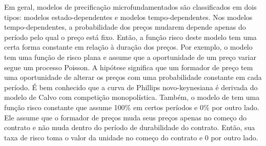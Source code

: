 \documentclass[twoside,a4paper,11pt]{report}
\begin{document}
% 
% 

Em geral, modelos de precificação microfundamentados são classificados em dois tipos: modelos estado-dependentes e modelos tempo-dependentes. Nos modelos tempo-dependentes, a probabilidade dos preços mudarem depende apenas do período pelo qual o preço está fixo. Então, a função risco deste modelo tem uma certa forma constante em relação à duração dos preços. Por exemplo, o modelo \citet{calvo1983staggered} tem uma função de risco plana e assume que a oportunidade de um preço variar segue um processo Poisson. A hipótese significa que um formador de preço tem uma oportunidade de alterar os preços com uma probabilidade constante em cada período. É bem conhecido que a curva de Phillips novo-keynesiana é derivada do modelo de Calvo com competição monopolística. Também, o modelo de \citet{taylor1980aggregate} tem uma função risco constante que assume 100\% em certos períodos e 0\% por outro lado. Ele assume que o formador de preços muda seus preços apenas no começo do contrato e não muda dentro do período de durabilidade do contrato. Então, sua taxa de risco toma o valor da unidade no começo do contrato e $0$ por outro lado. 
\end{document}
